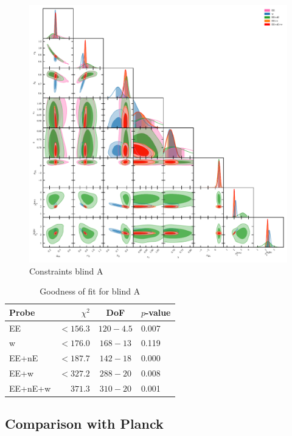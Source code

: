 \begin{figure}
	\begin{center}
		\includegraphics[width=\textwidth]{Parameter_Plots/omegam_sigma8_s8_ns_h_a_ia_b1l_b1h_blind_A}
		\caption{Constraints blind A}
		\label{fig:cosmology-params-all}
	\end{center}
\end{figure}


\begin{table}
	\begin{center}
		\caption{Goodness of fit for blind A}
		\label{tab:goodness-of-fit}
\begin{tabular}{lrcl}
    \toprule
    Probe             & $\chi^2$       & DoF       & $p$-value   \\
    \midrule
	EE               & $< 156.3$ & $120-4.5$ & 0.007 \\
	w                & $< 176.0$ & $168-13$ & 0.119 \\
	EE+nE            & $< 187.7$ & $142-18$ & 0.000 \\
	EE+w             & $< 327.2$ & $288-20$ & 0.008 \\
	EE+nE+w          & $371.3$ & $310-20$ & 0.001 \\

    \bottomrule
\end{tabular}
	\end{center}
\end{table}


\subsection{Comparison with Planck}
\label{sec:planck_comp}
